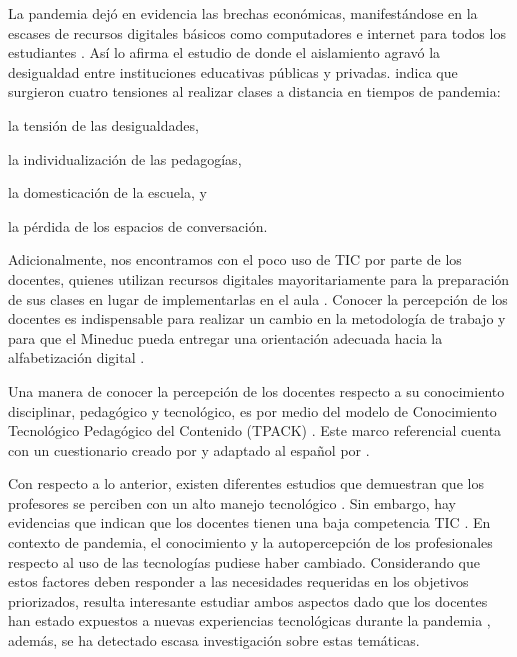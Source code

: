 \documentclass[spanish]{textolivre}
\begin{document}
La pandemia dejó en evidencia las brechas económicas, manifestándose en la escases de recursos digitales básicos como computadores e internet para todos los estudiantes \cite[p. 3]{quiroz_reyes_pandemia_2020}. Así lo afirma el estudio de \textcite[p. 8]{anderete_schwal_confinamiento_2022} donde el aislamiento agravó la desigualdad entre instituciones educativas públicas y privadas. \textcite[p. 6]{dussel_escuela_2020} indica que surgieron cuatro tensiones al realizar clases a distancia en tiempos de pandemia:
\begin{enumerate*}[label=(\arabic*)]
\item la tensión de las desigualdades, 
\item la individualización de las pedagogías, 
\item la domesticación de la escuela, y 
\item la pérdida de los espacios de conversación. 
\end{enumerate*}
Adicionalmente, nos encontramos con el poco uso de TIC por parte de los docentes, quienes utilizan recursos digitales mayoritariamente para la preparación de sus clases en lugar de implementarlas en el aula \cite{agencia_de_calidad_de_la_education_ace_estudio_2018,ibieta_role_2017}. Conocer la percepción de los docentes es indispensable para realizar un cambio en la metodología de trabajo y para que el Mineduc pueda entregar una orientación adecuada hacia la alfabetización digital \cite[p. 25]{agencia_de_calidad_de_la_educacion_ace_estudio:_2020}.

Una manera de conocer la percepción de los docentes respecto a su conocimiento disciplinar, pedagógico y tecnológico, es por medio del modelo de Conocimiento Tecnológico Pedagógico del Contenido (TPACK) \cite[p. 1]{thompson_editors_2007}. Este marco referencial cuenta con un cuestionario creado por \textcite{schmidt_technological_2009} y adaptado al español por \textcite{cabero_formacion_2014}. 

Con respecto a lo anterior, existen diferentes estudios que demuestran que los profesores se perciben con un alto manejo tecnológico \cite{arancibia_herrera_percepcion_2018,ministerio_de_educacion_mineduc_docentes_2016,rios_ariza_valoracion_2018}. Sin embargo, hay evidencias que indican que los docentes tienen una baja competencia TIC \cite{agencia_de_calidad_de_la_educacion_ace_estudio:_2020,canales_politica_2017,agencia_de_calidad_de_la_education_ace_estudio_2018,silva_teachers_2019}. En contexto de pandemia, el conocimiento y la autopercepción de los profesionales respecto al uso de las tecnologías pudiese haber cambiado. Considerando que estos factores deben responder a las necesidades requeridas en los objetivos priorizados, resulta interesante estudiar ambos aspectos dado que los docentes han estado expuestos a nuevas experiencias tecnológicas durante la pandemia \cite[p. 158]{santi_teachers_2020}, además, se ha detectado escasa investigación sobre estas temáticas. 
\end{document}

